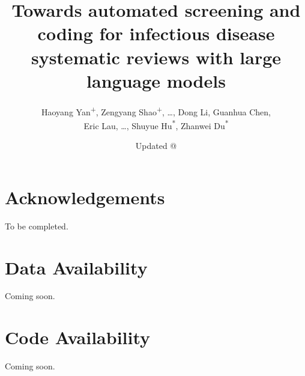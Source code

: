 \documentclass[11pt]{article}
\title{\vspace{-1.2em}Towards automated screening and coding for infectious disease\\[-0.05em]
systematic reviews with large language models}
\author[1]{Haoyang Yan\textsuperscript{+}, Zengyang Shao\textsuperscript{+}, \ldots, Dong Li, Guanhua Chen,\\
Eric Lau, \ldots, Shuyue Hu\textsuperscript{*}, Zhanwei Du\textsuperscript{*}}
\affil[1]{Affiliation 1, Department, Institution, City, Country}
\date{Updated @ \DTMtoday}
\begin{document}
\maketitle





\nocite{ref15,ref16,ref17,ref18,ref19,ref20,ref21,ref22,ref23,ref24,ref25,ref26,ref27}


\clearpage
\section*{Acknowledgements}
To be completed.

\section*{Data Availability}
Coming soon.

\section*{Code Availability}
Coming soon.

\clearpage
\nocite{ref31,ref32,ref33,ref34,ref35,ref36,ref37,ref38,ref39}
{}





\end{document}
